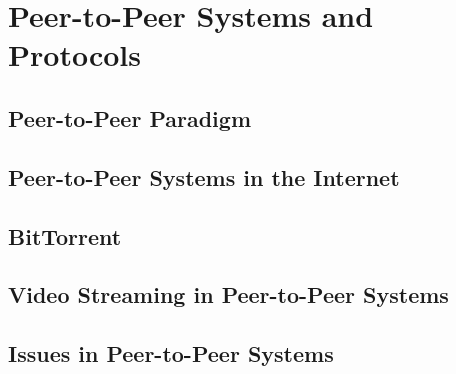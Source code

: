 
\chapter{Peer-to-Peer Systems and Protocols}
\label{chapter:p2p-systems}

\section{Peer-to-Peer Paradigm}
\label{sec:p2p-systems:p2p-paradigm}

\section{Peer-to-Peer Systems in the Internet}
\label{sec:p2p-systems:p2p-internet}

\section{BitTorrent}
\label{sec:p2p-systems:bittorrent}

\section{Video Streaming in Peer-to-Peer Systems}
\label{sec:p2p-systems:streaming}

\section{Issues in Peer-to-Peer Systems}
\label{sec:p2p-systems:issues}
